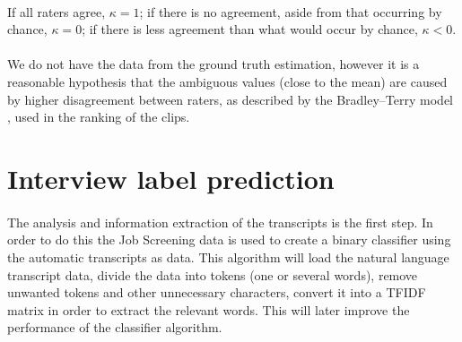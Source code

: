 \documentclass[12pt,a4paper]{report}
\begin{document}
\paragraph{} If all raters agree, $\kappa=1$; if there is no agreement, aside from that occurring by chance, $\kappa=0$; if there is less agreement than what would occur by chance, $\kappa<0$.

\paragraph{} We do not have the data from the ground truth estimation, however it is a reasonable hypothesis that the ambiguous values (close to the mean) are caused by higher disagreement between raters, as described by the Bradley–Terry model \cite{bradleyterry}, used in the ranking of the clips.

%
%


\section{Interview label prediction}

\paragraph{} The analysis and information extraction of the transcripts is the first step. In order to do this the Job Screening data is used to create a binary classifier using the automatic transcripts as data. This algorithm will load the natural language transcript data, divide the data into tokens (one or several words), remove unwanted tokens and other unnecessary characters, convert it into a TFIDF matrix in order to extract the relevant words. This will later improve the performance of the classifier algorithm.
\end{document}

